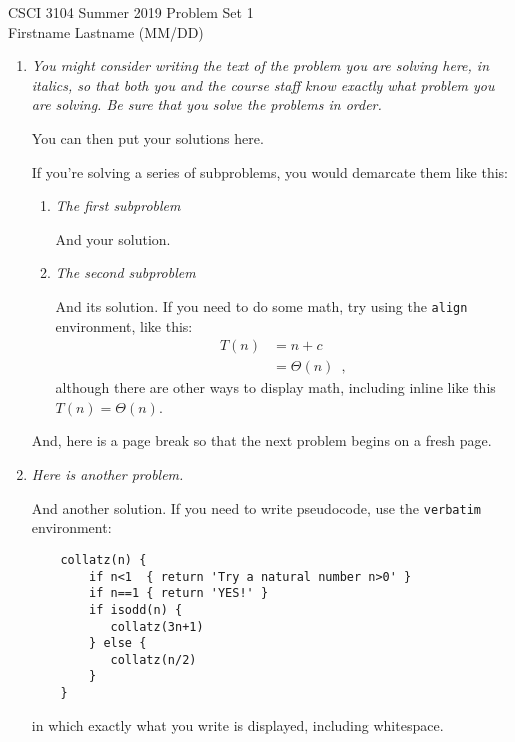 \documentclass[12pt]{article}
\begin{document}
CSCI 3104 Summer 2019 \hfill Problem Set 1\\
Firstname Lastname (MM/DD)

\hrulefill

\begin{enumerate}

	\item	\textit{You might consider writing the text of the problem you are solving here, in italics, so that both you and the course staff know exactly what problem you are solving. Be sure that you solve the problems in order.}

	You can then put your solutions here.

	If you're solving a series of subproblems, you would demarcate them like this:
	\begin{enumerate}
	\item \textit{The first subproblem}

	And your solution.

	\item \textit{The second subproblem}

	And its solution. If you need to do some math, try using the {\tt align} environment, like this:
	\begin{align}
	T(n) & = n+c \nonumber \\
	& = \Theta(n) \enspace ,
	\end{align}
	although there are other ways to display math, including inline like this $T(n)=\Theta(n)$.

	\end{enumerate}

	And, here is a page break so that the next problem begins on a fresh page.

	\newpage

	\item \textit{Here is another problem.}

	And another solution. If you need to write pseudocode, use the {\tt verbatim} environment:
	\begin{verbatim}
	collatz(n) {
	    if n<1  { return 'Try a natural number n>0' }
	    if n==1 { return 'YES!' }
	    if isodd(n) {
	       collatz(3n+1)
	    } else {
	       collatz(n/2)
	    }
	}
	\end{verbatim}
	in which exactly what you write is displayed, including whitespace.


\end{enumerate}
\end{document}
